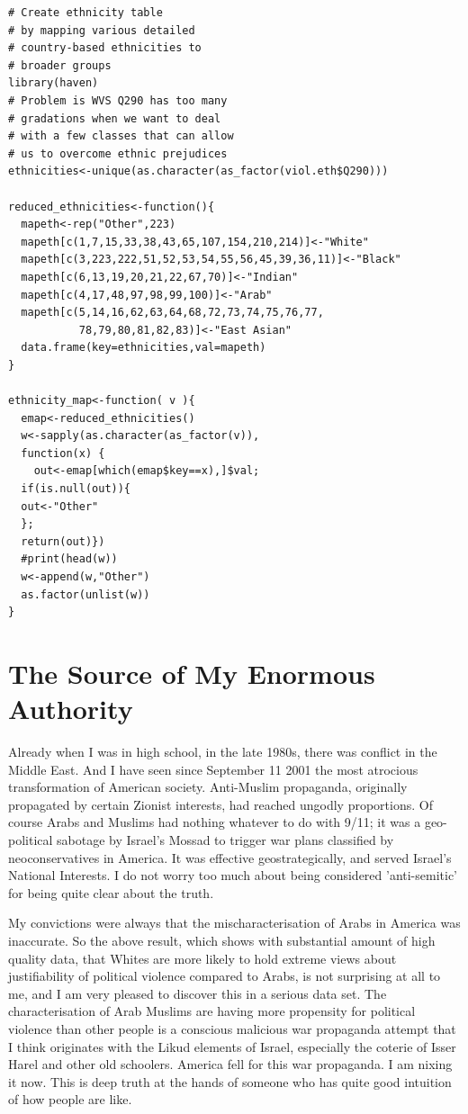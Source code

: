 \documentclass{amsart}
\begin{document}
\begin{verbatim}
# Create ethnicity table 
# by mapping various detailed
# country-based ethnicities to
# broader groups
library(haven)
# Problem is WVS Q290 has too many 
# gradations when we want to deal 
# with a few classes that can allow 
# us to overcome ethnic prejudices
ethnicities<-unique(as.character(as_factor(viol.eth$Q290)))

reduced_ethnicities<-function(){
  mapeth<-rep("Other",223)
  mapeth[c(1,7,15,33,38,43,65,107,154,210,214)]<-"White"
  mapeth[c(3,223,222,51,52,53,54,55,56,45,39,36,11)]<-"Black"
  mapeth[c(6,13,19,20,21,22,67,70)]<-"Indian"
  mapeth[c(4,17,48,97,98,99,100)]<-"Arab"
  mapeth[c(5,14,16,62,63,64,68,72,73,74,75,76,77,
           78,79,80,81,82,83)]<-"East Asian"
  data.frame(key=ethnicities,val=mapeth)
}

ethnicity_map<-function( v ){
  emap<-reduced_ethnicities()
  w<-sapply(as.character(as_factor(v)),
  function(x) {
  	out<-emap[which(emap$key==x),]$val;
  if(is.null(out)){
  out<-"Other"
  };
  return(out)})
  #print(head(w))
  w<-append(w,"Other")
  as.factor(unlist(w))
}

\end{verbatim}

\section{The Source of My Enormous Authority}

Already when I was in high school, in the late 1980s, there was conflict in the Middle East.  And I have seen since September 11 2001 the most atrocious transformation of American society.  Anti-Muslim propaganda, originally propagated by certain Zionist interests, had reached ungodly proportions.  Of course Arabs and Muslims had nothing whatever to do with 9/11; it was a geo-political sabotage by Israel's Mossad to trigger war plans classified by neoconservatives in America.  It was effective geostrategically, and served Israel's National Interests.  I do not worry too much about being considered 'anti-semitic' for being quite clear about the truth.  

My convictions were always that the mischaracterisation of Arabs in America was inaccurate.  So the above result, which shows with substantial amount of high quality data, that Whites are more likely to hold extreme views about justifiability of political violence compared to Arabs, is not surprising at all to me, and I am very pleased to discover this in a serious data set.  The characterisation of Arab Muslims are having more propensity for political violence than other people is a conscious malicious war propaganda attempt that I think originates with the Likud elements of Israel, especially the coterie of Isser Harel and other old schoolers.  America fell for this war propaganda.  I am nixing it now.  This is deep truth at the hands of someone who has quite good intuition of how people are like.
\end{document}
